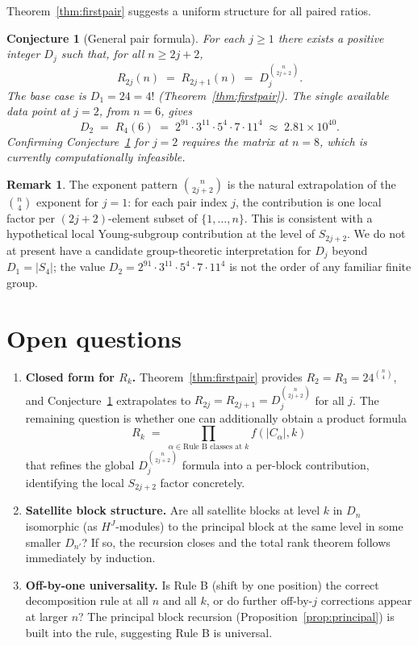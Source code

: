 \documentclass[11pt]{article}
\newtheorem{conjecture}[theorem]{Conjecture}
\theoremstyle{definition}
\newtheorem{remark}[theorem]{Remark}
\begin{document}
Theorem~\ref{thm:firstpair} suggests a uniform structure for all paired ratios.

\begin{conjecture}[General pair formula]
\label{conj:generalpair}
For each $j \ge 1$ there exists a positive integer $D_j$ such that, for all $n \ge 2j+2$,
\[
R_{2j}(n) \;=\; R_{2j+1}(n) \;=\; D_j^{\binom{n}{2j+2}}.
\]
The base case is $D_1 = 24 = 4!$ (Theorem~\ref{thm:firstpair}). The single available data point at $j = 2$, from $n = 6$, gives
\[
D_2 \;=\; R_4(6) \;=\; 2^{91} \cdot 3^{11} \cdot 5^4 \cdot 7 \cdot 11^4 \;\approx\; 2.81 \times 10^{40}.
\]
Confirming Conjecture~\ref{conj:generalpair} for $j = 2$ requires the matrix at $n = 8$, which is currently computationally infeasible.
\end{conjecture}

\begin{remark}
The exponent pattern $\binom{n}{2j+2}$ is the natural extrapolation of the $\binom{n}{4}$ exponent for $j=1$: for each pair index $j$, the contribution is one local factor per $(2j+2)$-element subset of $\{1,\dots,n\}$. This is consistent with a hypothetical local Young-subgroup contribution at the level of $S_{2j+2}$. We do not at present have a candidate group-theoretic interpretation for $D_j$ beyond $D_1 = |S_4|$; the value $D_2 = 2^{91} \cdot 3^{11} \cdot 5^4 \cdot 7 \cdot 11^4$ is not the order of any familiar finite group.
\end{remark}

\section{Open questions}

\begin{enumerate}
\item \textbf{Closed form for $R_k$.} Theorem~\ref{thm:firstpair} provides $R_2 = R_3 = 24^{\binom{n}{4}}$, and Conjecture~\ref{conj:generalpair} extrapolates to $R_{2j} = R_{2j+1} = D_j^{\binom{n}{2j+2}}$ for all $j$. The remaining question is whether one can additionally obtain a product formula
\[
R_k \;=\; \prod_{\alpha \in \text{Rule B classes at } k} f(|C_\alpha|, k)
\]
that refines the global $D_j^{\binom{n}{2j+2}}$ formula into a per-block contribution, identifying the local $S_{2j+2}$ factor concretely.

\item \textbf{Satellite block structure.} Are all satellite blocks at level $k$ in $D_n$ isomorphic (as $H^J$-modules) to the principal block at the same level in some smaller $D_{n'}$? If so, the recursion closes and the total rank theorem follows immediately by induction.

\item \textbf{Off-by-one universality.} Is Rule B (shift by one position) the correct decomposition rule at all $n$ and all $k$, or do further off-by-$j$ corrections appear at larger $n$? The principal block recursion (Proposition~\ref{prop:principal}) is built into the rule, suggesting Rule B is universal.
\end{enumerate}
\end{document}
